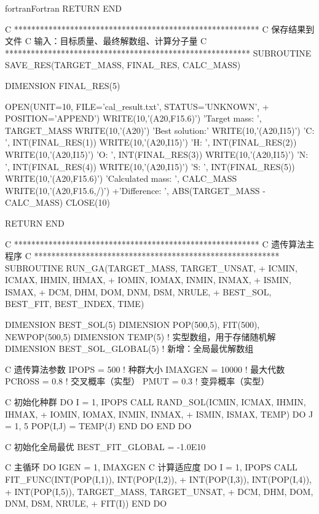 \begin{envcode}{fortran}{Fortran}
      RETURN
      END
      
C     *********************************************************
C     保存结果到文件
C     输入：目标质量、最终解数组、计算分子量
C     *********************************************************
      SUBROUTINE SAVE_RES(TARGET_MASS, FINAL_RES, CALC_MASS)
      
      DIMENSION FINAL_RES(5)
      
      OPEN(UNIT=10, FILE='cal_result.txt', STATUS='UNKNOWN', 
     +     POSITION='APPEND')
      WRITE(10,'(A20,F15.6)') 'Target mass: ', TARGET_MASS
      WRITE(10,'(A20)') 'Best solution:'
      WRITE(10,'(A20,I15)') 'C: ', INT(FINAL_RES(1))
      WRITE(10,'(A20,I15)') 'H: ', INT(FINAL_RES(2))
      WRITE(10,'(A20,I15)') 'O: ', INT(FINAL_RES(3))
      WRITE(10,'(A20,I15)') 'N: ', INT(FINAL_RES(4))
      WRITE(10,'(A20,I15)') 'S: ', INT(FINAL_RES(5))
      WRITE(10,'(A20,F15.6)') 'Calculated mass: ', CALC_MASS
      WRITE(10,'(A20,F15.6,/)')
     +'Difference: ', ABS(TARGET_MASS - CALC_MASS)
      CLOSE(10)
      
      RETURN
      END
      
C     *********************************************************
C     遗传算法主程序
C     *********************************************************
      SUBROUTINE RUN_GA(TARGET_MASS, TARGET_UNSAT,
     +                  ICMIN, ICMAX, IHMIN, IHMAX,
     +                  IOMIN, IOMAX, INMIN, INMAX,
     +                  ISMIN, ISMAX,
     +                  DCM, DHM, DOM, DNM, DSM, NRULE,
     +                  BEST_SOL, BEST_FIT, BEST_INDEX, TIME)
      
      DIMENSION BEST_SOL(5)
      DIMENSION POP(500,5), FIT(500), NEWPOP(500,5)
      DIMENSION TEMP(5)   ! 实型数组，用于存储随机解
      DIMENSION BEST_SOL_GLOBAL(5)      ! 新增：全局最优解数组

      
C     遗传算法参数
      IPOPS = 500        ! 种群大小
      IMAXGEN = 10000    ! 最大代数
      PCROSS = 0.8       ! 交叉概率（实型）
      PMUT = 0.3         ! 变异概率（实型）
      
C     初始化种群
      DO I = 1, IPOPS
          CALL RAND_SOL(ICMIN, ICMAX, IHMIN, IHMAX,
     +                  IOMIN, IOMAX, INMIN, INMAX,
     +                  ISMIN, ISMAX, TEMP)
          DO J = 1, 5
              POP(I,J) = TEMP(J)
          END DO
      END DO
      
C     初始化全局最优
      BEST_FIT_GLOBAL = -1.0E10
      
C     主循环
      DO IGEN = 1, IMAXGEN
C         计算适应度
          DO I = 1, IPOPS
              CALL FIT_FUNC(INT(POP(I,1)), INT(POP(I,2)),
     +                      INT(POP(I,3)), INT(POP(I,4)),
     +                      INT(POP(I,5)), TARGET_MASS, TARGET_UNSAT,
     +                      DCM, DHM, DOM, DNM, DSM, NRULE,
     +                      FIT(I))
          END DO
          

\end{envcode}

